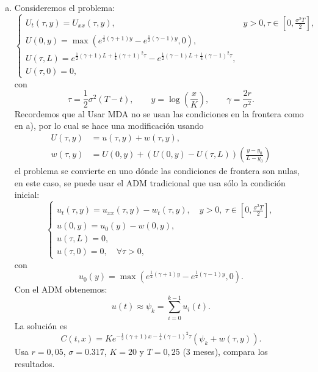 \documentclass[12pt]{article}
\newcommand{\pp}[1]{\left( #1 \right)}
\newcommand{\cc}[1]{\left[ #1 \right]}
\begin{document}
\begin{enumerate}
\begin{enumerate}[(a)]
            \item Consideremos el problema:
            \[
                \begin{cases}
                    U_t(\tau, y) = U_{xx}(\tau, y),\quad& y > 0,
                    \tau\in\cc{0, \tfrac{\sigma^2T}{2}},\\
                    U(0, y) = \max\pp{e^{\tfrac{1}{2}(\gamma+1)y}
                    -e^{\tfrac{1}{2}(\gamma-1)y},0},\\
                    U(\tau, L) = e^{\tfrac{1}{2}(\gamma+1)L+\tfrac{1}{4}
                    (\gamma+1)^2\tau}-e^{\tfrac{1}{2}(\gamma-1)L
                    +\tfrac{1}{4}(\gamma-1)^2\tau},\\
                    U(\tau, 0) = 0,
                \end{cases}
            \]
            con
            \[ \tau=\frac{1}{2}\sigma^2(T-t),\qquad y=\log\pp{\frac{x}{K}},
            \qquad \gamma=\frac{2r}{\sigma^2}. \]
            Recordemos que al Usar MDA no se usan las condiciones en la frontera
            como en a), por lo cual se hace una modificación usando
            \begin{align*}
                U(\tau,y) &= u(\tau,y)+w(\tau,y),\\
                w(\tau,y) &= U(0,y)+\pp{U(0,y)-U(\tau,L)}
                \pp{\frac{y-y_0}{L-y_0}}
            \end{align*}
            el problema se convierte en uno dónde las condiciones de frontera
            son nulas, en este caso, se puede usar el ADM tradicional que usa
            sólo la condición inicial:
            \[
                \begin{cases}
                    u_t(\tau,y)=u_{xx}(\tau, y)-w_t(\tau,y),\quad y>0,
                    ~\tau\in\cc{0,\tfrac{\sigma^2T}{2}},\\
                    u(0,y) = u_0(y)-w(0,y),\\
                    u(\tau,L)=0,\\
                    u(\tau,0)=0,\quad \forall \tau >0,
                \end{cases}
            \]
            con
            \[ u_0(y) = \max\pp{e^{\tfrac{1}{2}(\gamma+1)y}
            -e^{\tfrac{1}{2}(\gamma-1)y}, 0}. \]
            Con el ADM obtenemos:
            \[ u(t)\approx\psi_k = \sum_{i=0}^{k-1}u_i(t). \]
            La solución es
            \[ C(t, x)=Ke^{-\tfrac{1}{2}(\gamma+1)x
            -\tfrac{1}{4}(\gamma-1)^{2}\tau}\pp{\psi_k+w(\tau,y)}. \]
            Usa $r=0,05$, $\sigma=0.317$, $K=20$ y $T=0,25$ (3 meses), compara
            los resultados.

        \end{enumerate}
    \end{enumerate}
\end{document}
